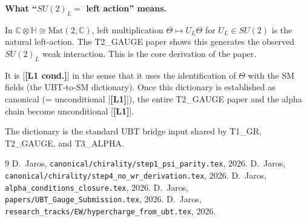 \documentclass[12pt,a4paper]{article}
\theoremstyle{remark}\newtheorem{remark}[theorem]{Remark}
\newcommand{\Lo}{\textbf{[L1]}}
\newcommand{\Lc}{\textbf{[L1 cond.]}}
\begin{document}
\begin{insightbox}
\textbf{What ``$SU(2)_L=$ left action'' means.}

In $\mathbb{C}\otimes\mathbb{H}\cong\mathrm{Mat}(2,\mathbb{C})$,
left multiplication $\Theta\mapsto U_L\Theta$ for $U_L\in SU(2)$ is the
natural left-action. The T2\_GAUGE paper shows this generates the observed
$SU(2)_L$ weak interaction. This is the core derivation of the paper.

It is [\Lc] in the sense that it uses the identification of $\Theta$
with the SM fields (the UBT-to-SM dictionary). Once this dictionary
is established as canonical (= unconditional [\Lo]),
the entire T2\_GAUGE paper and the alpha chain become unconditional [\Lo].

The dictionary is the standard UBT bridge input shared by T1\_GR, T2\_GAUGE,
and T3\_ALPHA.
\end{insightbox}

\begin{thebibliography}{9}
  D.~Jaros, \texttt{canonical/chirality/step1\_psi\_parity.tex}, 2026.
  D.~Jaros, \texttt{canonical/chirality/step4\_no\_wr\_derivation.tex}, 2026.
  D.~Jaros, \texttt{alpha\_conditions\_closure.tex}, 2026.
  D.~Jaros, \texttt{papers/UBT\_Gauge\_Submission.tex}, 2026.
  D.~Jaros, \texttt{research\_tracks/EW/hypercharge\_from\_ubt.tex}, 2026.
\end{thebibliography}

\ifdefined\INCLUDEMODE\else
\end{document}
